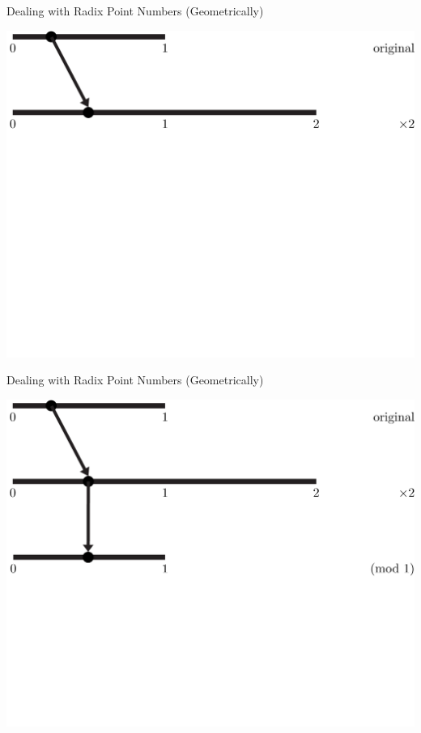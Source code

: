 \documentclass{beamer}
\begin{document}
        \begin{frame}{Dealing with Radix Point Numbers (Geometrically)}
          \begin{example}
            \includegraphics[width=\textwidth,height=0.75\textheight]{images/Binary/2}
          \end{example}
        \end{frame}

        \begin{frame}{Dealing with Radix Point Numbers (Geometrically)}
          \begin{example}
            \includegraphics[width=\textwidth,height=0.75\textheight]{images/Binary/3}
          \end{example}
        \end{frame}
\end{document}
